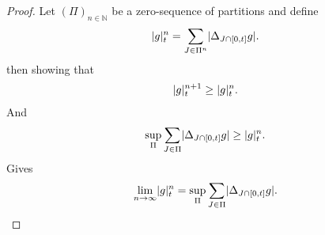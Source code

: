 \begin{proof}
  Let $(\Pi )_{n \in  \mathbb{N}}$ be a zero-sequence of partitions and define
 \begin{align*}
   \lvert g\rvert_t^n =  \sum_{J \in  \Pi^n}\lvert\Delta_{J \cap [0,t]} g\rvert 
 .\end{align*}
 then showing that 
 \begin{align*}
   \lvert g\rvert_t^{n+1} \ge    \lvert g\rvert_t^{n}
 .\end{align*}
And 
\begin{align*}
  \sup_{\Pi } \sum_{J \in  \Pi }\lvert\Delta_{J \cap [0,t]} g\rvert \ge  \lvert g\rvert_t^{n}
.\end{align*}
Gives
\begin{align*}
  \lim_{n \to \infty} \abs{g}_t^{n} = \sup_{\Pi } \sum_{J \in  \Pi }\abs{\Delta_{J \cap [0,t]} g}
.\end{align*}
\end{proof}
